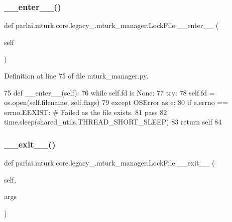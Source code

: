 \subsubsection{\texorpdfstring{\+\_\+\+\_\+enter\+\_\+\+\_\+()}{\_\_enter\_\_()}}
{\footnotesize\ttfamily def parlai.\+mturk.\+core.\+legacy\+\_.\+mturk\+\_\+manager.\+Lock\+File.\+\_\+\+\_\+enter\+\_\+\+\_\+ (\begin{DoxyParamCaption}\item[{}]{self }\end{DoxyParamCaption})}



Definition at line 75 of file mturk\+\_\+manager.\+py.


\begin{DoxyCode}
75     \textcolor{keyword}{def }\_\_enter\_\_(self):
76         \textcolor{keywordflow}{while} self.fd \textcolor{keywordflow}{is} \textcolor{keywordtype}{None}:
77             \textcolor{keywordflow}{try}:
78                 self.fd = os.open(self.filename, self.flags)
79             \textcolor{keywordflow}{except} OSError \textcolor{keyword}{as} e:
80                 \textcolor{keywordflow}{if} e.errno == errno.EEXIST:  \textcolor{comment}{# Failed as the file exists.}
81                     \textcolor{keywordflow}{pass}
82             time.sleep(shared\_utils.THREAD\_SHORT\_SLEEP)
83         \textcolor{keywordflow}{return} self
84 
\end{DoxyCode}
\mbox{\label{classparlai_1_1mturk_1_1core_1_1legacy__2018_1_1mturk__manager_1_1LockFile_a7d12653d7c19e3d4de616efefdff131d}} 
\subsubsection{\texorpdfstring{\+\_\+\+\_\+exit\+\_\+\+\_\+()}{\_\_exit\_\_()}}
{\footnotesize\ttfamily def parlai.\+mturk.\+core.\+legacy\+\_.\+mturk\+\_\+manager.\+Lock\+File.\+\_\+\+\_\+exit\+\_\+\+\_\+ (\begin{DoxyParamCaption}\item[{}]{self,  }\item[{}]{args }\end{DoxyParamCaption})}




